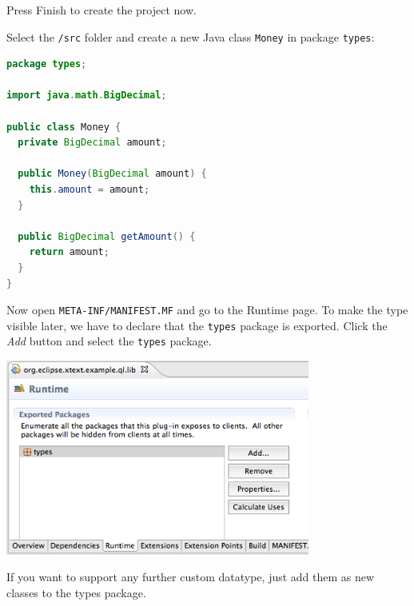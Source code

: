 Press Finish to create the project now.

Select the \texttt{/src} folder and create a new Java class \texttt{Money} in package
\texttt{types}:
\begin{lstlisting}[language=Java]
package types;

import java.math.BigDecimal;

public class Money {
  private BigDecimal amount;

  public Money(BigDecimal amount) {
    this.amount = amount;
  }

  public BigDecimal getAmount() {
    return amount;
  }
}
\end{lstlisting}

Now open \texttt{META-INF/MANIFEST.MF} and go to the Runtime page. To make the type
visible later, we have to declare that the \texttt{types} package is exported. Click the
\emph{Add} button and select the \texttt{types} package.

\includegraphics[width=10cm]{./images/chapter01/ExportPackage.png}

If you want to support any further custom datatype, just add them as new classes
to the types package.

